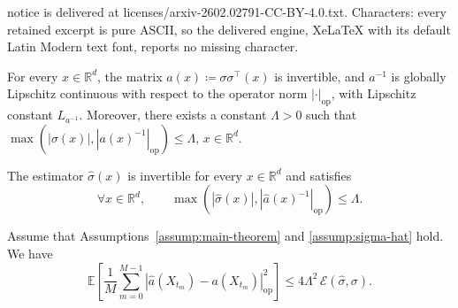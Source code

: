 \documentclass[10pt,a4paper]{amsart}
\newcommand{\EE}{\mathbb{E}}
\newcommand{\RD}{\mathbb{R}^{d}}
\begin{document}
notice is delivered at licenses/arxiv-2602.02791-CC-BY-4.0.txt. Characters: every retained excerpt is pure ASCII, so the delivered engine, XeLaTeX with its default Latin Modern text font, reports no missing character.
\begin{assumption}\label{assump:main-theorem}
For every $x \in \mathbb{R}^d$, the matrix $a(x) \coloneqq \sigma\sigma^{\top}(x)$ is invertible, and $a^{-1}$ is globally Lipschitz continuous with respect to the operator norm $|\cdot|_{\mathrm{op}}$, with Lipschitz constant $L_{a^{-1}}$. Moreover, there exists a constant $\Lambda > 0$ such that $\max(|\sigma(x)|,|a(x)^{-1}|_{\mathrm{op}}) \leq \Lambda, \,x\in\RD$.
\end{assumption}

\begin{assumption}\label{assump:sigma-hat}
The estimator $\widehat\sigma(x)$ is invertible for every $x\in\RD$ and satisfies
\[
\forall x\in\RD,\qquad \max(|\widehat\sigma(x)|, |\widehat{a}(x)^{-1}|_{\mathrm{op}}) \le \Lambda.
\]
\end{assumption}

\begin{lemma}\label{lem:a-hat-sigma-hat-bound}
Assume that Assumptions~\ref{assump:main-theorem} and \ref{assump:sigma-hat} hold. We have
\[
\EE\!\left[
\frac{1}{M}\sum_{m=0}^{M-1}
\left|\widehat a(X_{t_m})-a(X_{t_m})\right|_{\mathrm{op}}^2
\right]
\le 4\Lambda^2\,\mathcal E(\widehat \sigma,\sigma).
\]
\end{lemma}
\end{document}
